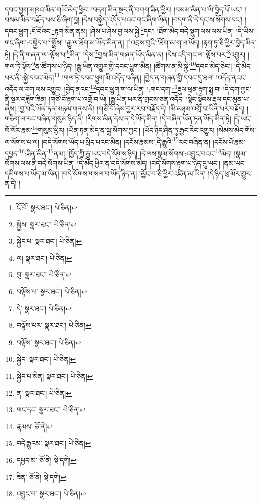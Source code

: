དབང་ཕྱུག་མཁའ་མིན་གཡོ་མེད་ཕྱིར། །བདག་མིན་སྔར་ནི་བཀག་ཟིན་ཕྱིར། །བསམ་མིན་པ་ཡི་བྱེད་པོ་ཡང་། །བསམ་མིན་བརྗོད་པས་ཅི་ཞིག་བྱ། །དེས་བསྐྱེད་འདོད་པའང་གང་ཞིག་ཡིན། །བདག་ནི་དེ་དང་ས་སོགས་དང་། །དབང་ཕྱུག་:ངོ་བོའང་\footnote{ངོ་བོ་  སྣར་ཐང་།  པེ་ཅིན། }རྟག་མིན་ནམ། །ཤེས་པ་ཤེས་བྱ་ལས་སྐྱེ་\footnote{སྐྱེས་  སྣར་ཐང་།  པེ་ཅིན། }དང་། །ཐོག་མེད་བདེ་སྡུག་ལས་ལས་ཡིན། །དེ་ཡིས་གང་ཞིག་:བསྐྱེད་པ་\footnote{སྐྱེད་པ་  སྣར་ཐང་།  པེ་ཅིན། }སྨྲོས། །རྒྱུ་ལ་ཐོག་མ་ཡོད་མིན་ན། །\footnote{ལ།   སྣར་ཐང་།  པེ་ཅིན། }འབྲས་བུའི་\footnote{བུ་  སྣར་ཐང་།  པེ་ཅིན། }ཐོག་མ་ག་ལ་ཡོད། །རྟག་ཏུ་ཅི་ཕྱིར་བྱེད་མིན་ཏེ། །དེ་ནི་གཞན་ལ་:ལྟོས་པ་\footnote{བལྟོས་པ་  སྣར་ཐང་།  པེ་ཅིན། }མིན། །དེས་\footnote{དེ་  སྣར་ཐང་།  པེ་ཅིན། }བྱས་མིན་གཞན་ཡོད་མིན་ན། །དེས་འདི་གང་ལ་:ལྟོས་པར་\footnote{བལྟོས་པར་  སྣར་ཐང་།  པེ་ཅིན། }འགྱུར། །གལ་ཏེ་ལྟོས་\footnote{བལྟོས་  སྣར་ཐང་།  པེ་ཅིན། }ན་ཚོགས་པ་ཉིད། །རྒྱུ་ཡིན་འགྱུར་གྱི་དབང་ཕྱུག་མིན། །ཚོགས་ན་མི་སྐྱེ་\footnote{སྐྱེད་  སྣར་ཐང་།  པེ་ཅིན། }དབང་མེད་ཅིང་། །དེ་མེད་པར་ནི་:སྐྱེ་དབང་མེད།\footnote{སྐྱེད་པ་མིན།  སྣར་ཐང་།  པེ་ཅིན། } །གལ་ཏེ་དབང་ཕྱུག་མི་འདོད་བཞིན། །བྱེད་ན་གཞན་གྱི་དབང་དུ་ཐལ། །འདོད་ནའང་འདོད་ལ་རག་ལས་འགྱུར། །བྱེད་ནའང་\footnote{ན་  སྣར་ཐང་།  པེ་ཅིན། }དབང་ཕྱུག་ག་ལ་ཡིན། །:གང་དག་\footnote{གང་དང་  སྣར་ཐང་།  པེ་ཅིན། }རྡུལ་ཕྲན་རྟག་སྨྲ་བ། །དེ་དག་ཀྱང་ནི་སྔར་བཟློག་ཟིན། །གཙོ་བོ་རྟག་པ་འགྲོ་བ་ཡི། །རྒྱུ་ཡིན་པར་ནི་གྲངས་ཅན་འདོད། །སྙིང་སྟོབས་རྡུལ་དང་མུན་པ་ཞེས། །བྱ་བའི་ཡོན་ཏན་མཉམ་གནས་ནི། །གཙོ་བོ་ཞེས་བྱར་རབ་བརྗོད་དེ། །མི་མཉམ་འགྲོ་བ་ཡིན་པར་བརྗོད། །གཅིག་ལ་རང་བཞིན་གསུམ་ཉིད་ནི། །རིགས་མིན་དེས་ན་དེ་ཡོད་མིན། །དེ་བཞིན་ཡོན་ཏན་ཡོད་མིན་ཏེ། །དེ་ཡང་སོ་སོར་རྣམ་\footnote{རྣམས་  ཅོ་ནེ། }གསུམ་ཕྱིར། །ཡོན་ཏན་མེད་ན་སྒྲ་སོགས་ཀྱང་། །ཡོད་ཉིད་ཤིན་ཏུ་རྒྱང་རིང་འགྱུར། །སེམས་མེད་གོས་ལ་སོགས་པ་ལ། །བདེ་སོགས་ཡོད་པ་སྲིད་པའང་མིན། །དངོས་རྣམས་:དེ་རྒྱུའི་\footnote{བདེ་རྒྱུའམ་  སྣར་ཐང་།  པེ་ཅིན། }རང་བཞིན་ན། །དངོས་པོ་རྣམ་དཔྱད་\footnote{དཔྱད་མ་  ཅོ་ནེ།  སྡེ་དགེ། }:ཟིན་མིན་\footnote{ཟིན་  ཅོ་ནེ།  སྡེ་དགེ། }ནམ། །ཁྱོད་ཀྱི་རྒྱུ་ཡང་བདེ་སོགས་ཉིད། །དེ་ལས་སྣམ་སོགས་:འབྱུང་བའང་\footnote{འབྱུང་བ་  སྣར་ཐང་།  པེ་ཅིན། }མེད། །སྣམ་སོགས་ལས་ནི་བདེ་སོགས་ཡིན། །དེ་མེད་ཕྱིར་ན་བདེ་སོགས་མེད། །བདེ་སོགས་རྟག་པ་ཉིད་དུ་ཡང་། །ནམ་ཡང་དམིགས་པ་ཡོད་མ་ཡིན། །བདེ་སོགས་གསལ་བ་ཡོད་ཉིད་ན། །མྱོང་བ་ཅི་ཕྱིར་འཛིན་མ་ཡིན། །དེ་ཉིད་ཕྲ་མོར་གྱུར་ན་དེ། །
